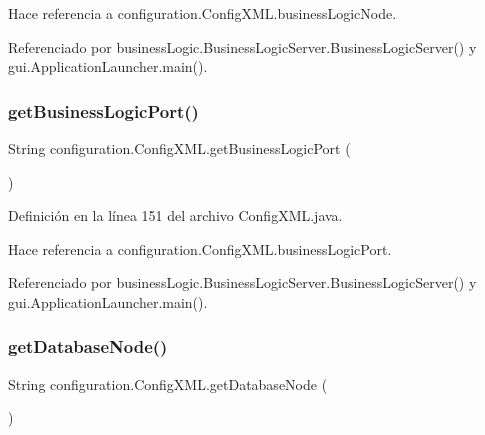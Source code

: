 Hace referencia a configuration.\+Config\+X\+M\+L.\+business\+Logic\+Node.



Referenciado por business\+Logic.\+Business\+Logic\+Server.\+Business\+Logic\+Server() y gui.\+Application\+Launcher.\+main().

\mbox{\label{classconfiguration_1_1_config_x_m_l_a7e8cb431bc1e899176ae2891c007f7f3}} 
\subsubsection{\texorpdfstring{getBusinessLogicPort()}{getBusinessLogicPort()}}
{\footnotesize\ttfamily String configuration.\+Config\+X\+M\+L.\+get\+Business\+Logic\+Port (\begin{DoxyParamCaption}{ }\end{DoxyParamCaption})}



Definición en la línea 151 del archivo Config\+X\+M\+L.\+java.


\begin{DoxyCode}{0}

\end{DoxyCode}


Hace referencia a configuration.\+Config\+X\+M\+L.\+business\+Logic\+Port.



Referenciado por business\+Logic.\+Business\+Logic\+Server.\+Business\+Logic\+Server() y gui.\+Application\+Launcher.\+main().

\mbox{\label{classconfiguration_1_1_config_x_m_l_a622fdcb9a55b406b6bc2fa63509dae72}} 
\subsubsection{\texorpdfstring{getDatabaseNode()}{getDatabaseNode()}}
{\footnotesize\ttfamily String configuration.\+Config\+X\+M\+L.\+get\+Database\+Node (\begin{DoxyParamCaption}{ }\end{DoxyParamCaption})}



